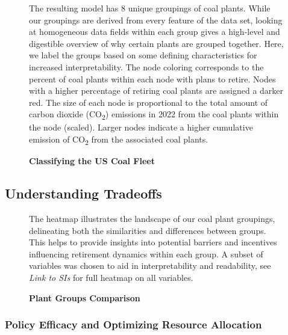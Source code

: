 \begin{figure}[H]
    
    \caption{\textbf{Classifying the US Coal Fleet}}
    \medskip
    \footnotesize
    The resulting model has 8 unique groupings of coal plants. While our groupings are derived from every feature of the data set, looking at homogeneous data fields within each group gives a high-level and digestible overview of why certain plants are grouped together. Here, we label the groups based on some defining characteristics for increased interpretability.
    The node coloring corresponds to the percent of coal plants within each node with plans to retire. Nodes with a higher percentage of retiring coal plants are assigned a darker red. The size of each node is proportional to the total amount of carbon dioxide (CO\textsubscript{2}) emissions in 2022 from the coal plants within the node (scaled). 
    Larger nodes indicate a higher cumulative emission of CO\textsubscript{2} from the associated coal plants.
    \label{fig:coal-fleet-partition}
\end{figure}



\subsection{Understanding Tradeoffs}

\begin{figure}[H]
      
    \caption{\textbf{Plant Groups Comparison}}
    \medskip
    \footnotesize
    The heatmap illustrates the landscape of our coal plant groupings, delineating both the similarities and differences between groups. This helps to provide insights into potential barriers and incentives influencing retirement dynamics within each group.
    A subset of variables was chosen to aid in interpretability and readability, see \textit{Link to SIs} for full heatmap on all variables.
    \label{fig:heatmap}
\end{figure}

\subsubsection{Policy Efficacy and Optimizing Resource Allocation}



